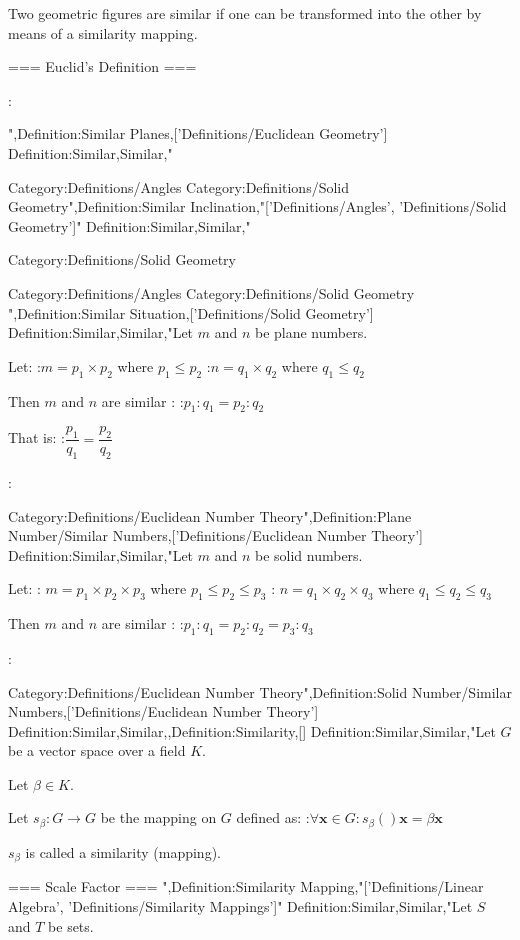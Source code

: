 Two geometric figures are similar if one can be transformed into the other by means of a similarity mapping.


=== Euclid's Definition ===


:

",Definition:Similar Planes,['Definitions/Euclidean Geometry']
Definition:Similar,Similar,"

Category:Definitions/Angles
Category:Definitions/Solid Geometry",Definition:Similar Inclination,"['Definitions/Angles', 'Definitions/Solid Geometry']"
Definition:Similar,Similar,"



Category:Definitions/Solid Geometry


Category:Definitions/Angles
Category:Definitions/Solid Geometry
",Definition:Similar Situation,['Definitions/Solid Geometry']
Definition:Similar,Similar,"Let $m$ and $n$ be plane numbers.

Let:
:$m = p_1 \times p_2$ where $p_1 \le p_2$
:$n = q_1 \times q_2$ where $q_1 \le q_2$

Then $m$ and $n$ are similar :
:$p_1 : q_1 = p_2 : q_2$


That is:
:$\dfrac {p_1} {q_1} = \dfrac {p_2} {q_2}$



:


Category:Definitions/Euclidean Number Theory",Definition:Plane Number/Similar Numbers,['Definitions/Euclidean Number Theory']
Definition:Similar,Similar,"Let $m$ and $n$ be solid numbers.

Let:
: $m = p_1 \times p_2 \times p_3$ where $p_1 \le p_2 \le p_3$
: $n = q_1 \times q_2 \times q_3$ where $q_1 \le q_2 \le q_3$

Then $m$ and $n$ are similar :
:$p_1 : q_1 = p_2 : q_2 = p_3 : q_3$



:


Category:Definitions/Euclidean Number Theory",Definition:Solid Number/Similar Numbers,['Definitions/Euclidean Number Theory']
Definition:Similar,Similar,,Definition:Similarity,[]
Definition:Similar,Similar,"Let $G$ be a vector space over a field $K$.

Let $\beta \in K$.

Let $s_\beta: G \to G$ be the mapping on $G$ defined as:
:$\forall \mathbf x \in G: s_\beta \left(   \right){\mathbf x} = \beta \mathbf x$


$s_\beta$ is called a similarity (mapping).


=== Scale Factor ===
",Definition:Similarity Mapping,"['Definitions/Linear Algebra', 'Definitions/Similarity Mappings']"
Definition:Similar,Similar,"Let $S$ and $T$ be sets.


